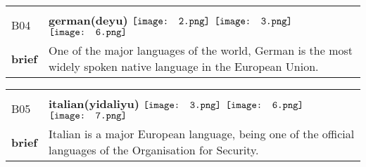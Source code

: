 \documentclass[UTF8]{article}
\begin{document}
            \begin{tabularx}{\textwidth}{p{1.5cm}X}
            \arrayrulecolor{myBlue}
        	\hline\\
            \small{B04}&
            \large{\bfseries{german(deyu)}}\hfill
                                                            \phantom{$\vcenter{\hbox{\texttt{[image: 1.png]}}}$}
                                                                $\vcenter{\hbox{\texttt{[image: 2.png]}}}$
                                                                $\vcenter{\hbox{\texttt{[image: 3.png]}}}$
                                                                \phantom{$\vcenter{\hbox{\texttt{[image: 4.png]}}}$}
                                                                \phantom{$\vcenter{\hbox{\texttt{[image: 5.png]}}}$}
                                                                $\vcenter{\hbox{\texttt{[image: 6.png]}}}$
                                                                \phantom{$\vcenter{\hbox{\texttt{[image: 7.png]}}}$}
                                        \\[10pt]
            \large{\bfseries{brief}}&\noindent\parbox[c]{\hsize}{One of the major languages of the world, German is the most widely spoken native language in the European Union.} \\[5pt]
            \hline\\[-10pt]
        \end{tabularx}
            \begin{tabularx}{\textwidth}{p{1.5cm}X}
            \arrayrulecolor{myBlue}
        	\hline\\
            \small{B05}&
            \large{\bfseries{italian(yidaliyu)}}\hfill
                                                            \phantom{$\vcenter{\hbox{\texttt{[image: 1.png]}}}$}
                                                                \phantom{$\vcenter{\hbox{\texttt{[image: 2.png]}}}$}
                                                                $\vcenter{\hbox{\texttt{[image: 3.png]}}}$
                                                                \phantom{$\vcenter{\hbox{\texttt{[image: 4.png]}}}$}
                                                                \phantom{$\vcenter{\hbox{\texttt{[image: 5.png]}}}$}
                                                                $\vcenter{\hbox{\texttt{[image: 6.png]}}}$
                                                                $\vcenter{\hbox{\texttt{[image: 7.png]}}}$
                                        \\[10pt]
            \large{\bfseries{brief}}&\noindent\parbox[c]{\hsize}{Italian is a major European language, being one of the official languages of the Organisation for Security.} \\[5pt]
            \hline\\[-10pt]
        \end{tabularx}
\end{document}
